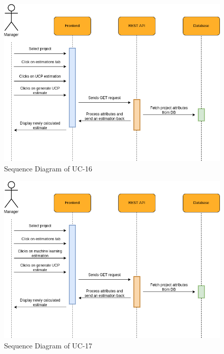         \begin{figure}[H]
            \centering
            \includegraphics[scale=0.5]{./diagrams/sequence/seq-16.png}
            \caption{Sequence Diagram of UC-16}
            \label{fig:seq-16}
            
        \end{figure}
    

        \begin{figure}[H]
            \centering
            \includegraphics[scale=0.5]{./diagrams/sequence/seq-17.png}
            \caption{Sequence Diagram of UC-17}
            \label{fig:seq-17}
            
        \end{figure}
    

